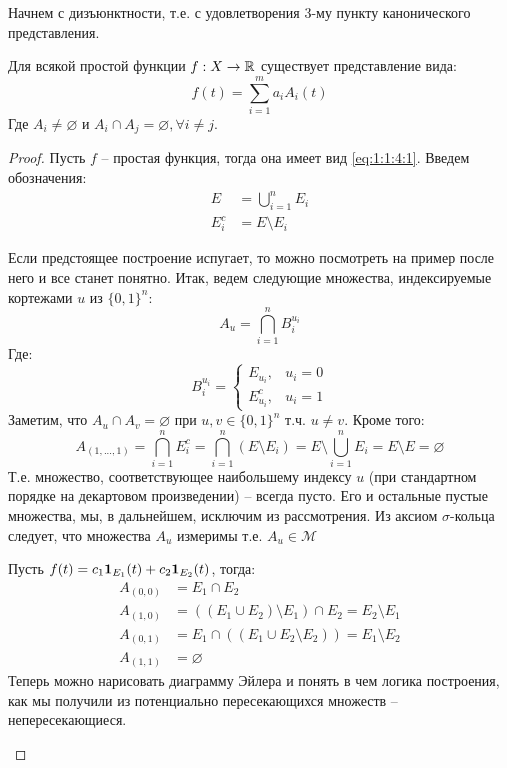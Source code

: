 \documentclass[../main.tex]{subfiles}
\begin{document}
Начнем с дизъюнктности, т.е. с удовлетворения 3-му пункту канонического представления.
\begin{lemma}
	Для всякой простой функции $f : X \to \mathbb{R}$ существует представление вида:
	\begin{equation*}
		f(t) = \sum_{i=1}^{m}{a_i A_i (t)}
	\end{equation*}
	Где $A_i \neq \varnothing$ и $A_i \cap A_j = \varnothing, \forall i \neq j$.
\end{lemma}
\begin{proof}
	Пусть $f$ -- простая функция, тогда она имеет вид \eqref{eq:1:1:4:1}. Введем обозначения:
	\begin{align*}
		E &= \bigcup_{i=1}^{n}{E_i} \\
		E_i^c &= E \setminus E_i
	\end{align*}
	
	Если предстоящее построение испугает, то можно посмотреть на пример после него и все станет понятно. Итак, ведем следующие множества, индексируемые кортежами $u$ из $\{0, 1\}^n$:
	\begin{equation}\label{eq:1:1:4:2}
		A_u = \bigcap_{i=1}^{n}{B_i^{u_i}}
	\end{equation}
	Где:
	$$B_i^{u_i} = \begin{cases}
		E_{u_i}, &u_i = 0 \\
		E_{u_i}^c, &u_i = 1
	\end{cases}$$
	Заметим, что $A_u \cap A_v = \varnothing$ при $u, v \in \{0, 1\}^n$ т.ч. $u \neq v$. Кроме того:
	$$A_{(1, ..., 1)} = \bigcap_{i=1}^{n}{E_i^c} = \bigcap_{i=1}^{n}{(E \setminus E_i)} = E \setminus \bigcup_{i=1}^{n}{E_i} = E \setminus E = \varnothing$$
	Т.е. множество, соответствующее наибольшему индексу $u$ (при стандартном порядке на декартовом произведении) -- всегда пусто. Его и остальные пустые множества, мы, в дальнейшем, исключим из рассмотрения. Из аксиом $\sigma$-кольца следует, что множества $A_u$ измеримы т.е. $A_u \in \mathcal{M}$
	
	\begin{example}
		Пусть $f(t) = c_1 \mathbf{1}_{E_1} (t) + c_2 \mathbf{1}_{E_2} (t)$, тогда:
		\begin{align*}
			A_{(0, 0)} &= E_1 \cap E_2 \\
			A_{(1, 0)} &= ((E_1 \cup E_2) \setminus E_1) \cap E_2 = E_2 \setminus E_1 \\
			A_{(0, 1)} &= E_1 \cap ((E_1 \cup E_2 \setminus E_2)) = E_1 \setminus E_2 \\
			A_{(1, 1)} &= \varnothing
		\end{align*}
		Теперь можно нарисовать диаграмму Эйлера и понять в чем логика построения, как мы получили из потенциально пересекающихся множеств -- непересекающиеся.
	\end{example}


\end{proof}
\end{document}
